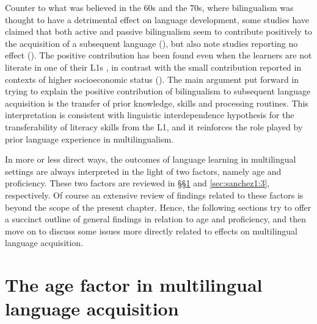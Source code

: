 \documentclass[output=paper]{../langscibook}
\begin{document}
Counter to what was believed in the 60s and the 70s, where bilingualism was thought to have a detrimental effect on language development, some studies have claimed that both active and passive bilingualism seem to contribute positively to the acquisition of a subsequent language (\citealt{CenozValencia1994, Muñoz2000, Sanz2000, Brohy2001}), but also note studies reporting no effect (\citealt{JaspaertLemmens1990, SandersMeijers1995}). The positive contribution has been found even when the learners are not literate in one of their L1s \citep{WagnerEtAl1989}, in contrast with the small contribution reported in contexts of higher socioeconomic status (\citealt{BenmamounEtAl2013, Polinsky2015}). The main argument put forward in trying to explain the positive contribution of bilingualism to subsequent language acquisition is the transfer of prior knowledge, skills and processing routines. This interpretation is consistent with  linguistic interdependence hypothesis for the transferability of literacy skills from the L1, and it reinforces the role played by prior language experience in multilingualism.

In more or less direct ways, the outcomes of language learning in multilingual settings are always interpreted in the light of two factors, namely age and proficiency. These two factors are reviewed in §§\ref{sec:sanchez1:2} and \ref{sec:sanchez1:3}, respectively. Of course an extensive review of findings related to these factors is beyond the scope of the present chapter. Hence, the following sections try to offer a succinct outline of general findings in relation to age and proficiency, and then move on to discuss some issues more directly related to effects on multilingual language acquisition.

\section{The age factor in multilingual language acquisition}\label{sec:sanchez1:2}
\end{document}

